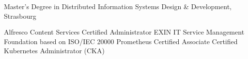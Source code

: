 %
%
%


\begin{scholarship}
					{Master's Degree in Distributed Information Systems Design \& Development, Strasbourg}
\end{scholarship}

\begin{scholarship}
					{Alfresco Content Services Certified Administrator}
					{EXIN IT Service Management Foundation based on ISO/IEC 20000}
					{Prometheus Certified Associate}
					{Certified Kubernetes Administrator (CKA)}
\end{scholarship}
